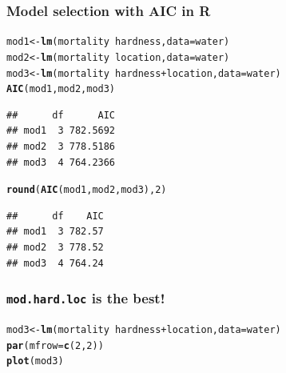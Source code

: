 \documentclass{beamer}\usepackage[]{graphicx}\usepackage[]{color}
\makeatletter
\newcommand{\hlnum}[1]{\textcolor[rgb]{0.686,0.059,0.569}{#1}}%
\newcommand{\hlopt}[1]{\textcolor[rgb]{0,0,0}{#1}}%
\newcommand{\hlstd}[1]{\textcolor[rgb]{0.345,0.345,0.345}{#1}}%
\newcommand{\hlkwb}[1]{\textcolor[rgb]{0.69,0.353,0.396}{#1}}%
\newcommand{\hlkwc}[1]{\textcolor[rgb]{0.333,0.667,0.333}{#1}}%
\newcommand{\hlkwd}[1]{\textcolor[rgb]{0.737,0.353,0.396}{\textbf{#1}}}%
\newenvironment{kframe}{%
 \def\at@end@of@kframe{}%
 \ifinner\ifhmode%
  \def\at@end@of@kframe{\end{minipage}}%
  \begin{minipage}{\columnwidth}%
 \fi\fi%
 \def\FrameCommand##1{\hskip\@totalleftmargin \hskip-\fboxsep
 \colorbox{shadecolor}{##1}\hskip-\fboxsep
     \hskip-\linewidth \hskip-\@totalleftmargin \hskip\columnwidth}%
 \MakeFramed {\advance\hsize-\width
   \@totalleftmargin\z@ \linewidth\hsize
   \@setminipage}}%
 {\par\unskip\endMakeFramed%
 \at@end@of@kframe}
\newenvironment{knitrout}{}{} %
\makeatother
\begin{document}
{{{%

\begin{frame}[fragile]
\frametitle{Model selection with AIC in R}
\begin{knitrout}\scriptsize
{}\color{fgcolor}\begin{kframe}
\begin{alltt}
\hlstd{mod1} \hlkwb{<-} \hlkwd{lm}\hlstd{(mortality} \hlopt{~} \hlstd{hardness,} \hlkwc{data} \hlstd{= water)}
\hlstd{mod2} \hlkwb{<-} \hlkwd{lm}\hlstd{(mortality} \hlopt{~} \hlstd{location,} \hlkwc{data} \hlstd{= water)}
\hlstd{mod3} \hlkwb{<-} \hlkwd{lm}\hlstd{(mortality} \hlopt{~} \hlstd{hardness} \hlopt{+} \hlstd{location,} \hlkwc{data} \hlstd{= water)}
\hlkwd{AIC}\hlstd{(mod1, mod2, mod3)}
\end{alltt}
\begin{verbatim}
##      df      AIC
## mod1  3 782.5692
## mod2  3 778.5186
## mod3  4 764.2366
\end{verbatim}
\begin{alltt}
\hlkwd{round}\hlstd{(}\hlkwd{AIC}\hlstd{(mod1, mod2, mod3),} \hlnum{2}\hlstd{)}
\end{alltt}
\begin{verbatim}
##      df    AIC
## mod1  3 782.57
## mod2  3 778.52
## mod3  4 764.24
\end{verbatim}
\end{kframe}
\end{knitrout}
\end{frame}


\begin{frame}[fragile]
\frametitle{\texttt{mod.hard.loc} is the best!}
\begin{knitrout}\scriptsize
{}\color{fgcolor}\begin{kframe}
\begin{alltt}
\hlstd{mod3} \hlkwb{<-} \hlkwd{lm}\hlstd{(mortality} \hlopt{~} \hlstd{hardness} \hlopt{+} \hlstd{location,} \hlkwc{data} \hlstd{= water)}
\hlkwd{par}\hlstd{(}\hlkwc{mfrow}\hlstd{=}\hlkwd{c}\hlstd{(}\hlnum{2}\hlstd{,}\hlnum{2}\hlstd{))}
\hlkwd{plot}\hlstd{(mod3)}
\end{alltt}
\end{kframe}


\end{knitrout}
\end{frame}}}}
\end{document}
